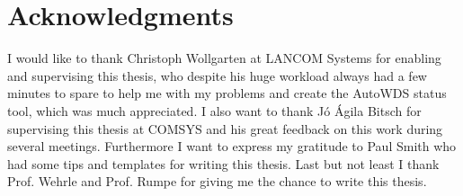 \cleardoublepage

\chapter*{Acknowledgments}

I would like to thank Christoph Wollgarten at LANCOM Systems for enabling and supervising this thesis, 
who despite his huge workload always had a few minutes to spare to help me with my problems and create the AutoWDS status tool, 
which was much appreciated.
I also want to thank J\'o \'Agila Bitsch for supervising this thesis at COMSYS and his great feedback on this work during several meetings.
Furthermore I want to express my gratitude to Paul Smith who had some tips and templates for writing this thesis.
Last but not least I thank Prof. Wehrle and Prof. Rumpe for giving me the chance to write this thesis.